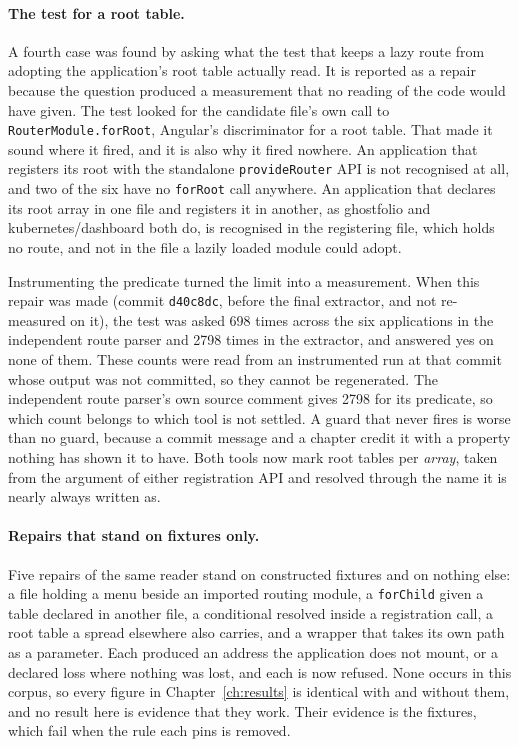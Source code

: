 \paragraph{The test for a root table.} A fourth case was found by asking what the test that keeps a lazy route from adopting the application's root table actually read. It is reported as a repair because the question produced a measurement that no reading of the code would have given. The test looked for the candidate file's own call to \texttt{RouterModule.forRoot}, Angular's discriminator for a root table. That made it sound where it fired, and it is also why it fired nowhere. An application that registers its root with the standalone \texttt{provideRouter} API is not recognised at all, and two of the six have no \texttt{forRoot} call anywhere. An application that declares its root array in one file and registers it in another, as ghostfolio and kubernetes/dashboard both do, is recognised in the registering file, which holds no route, and not in the file a lazily loaded module could adopt.

Instrumenting the predicate turned the limit into a measurement. When this repair was made (commit \texttt{d40c8dc}, before the final extractor, and not re-measured on it), the test was asked 698 times across the six applications in the independent route parser and 2798 times in the extractor, and answered yes on none of them. These counts were read from an instrumented run at that commit whose output was not committed, so they cannot be regenerated. The independent route parser's own source comment gives 2798 for its predicate, so which count belongs to which tool is not settled. A guard that never fires is worse than no guard, because a commit message and a chapter credit it with a property nothing has shown it to have. Both tools now mark root tables per \emph{array}, taken from the argument of either registration API and resolved through the name it is nearly always written as.

\paragraph{Repairs that stand on fixtures only.} Five repairs of the same reader stand on constructed fixtures and on nothing else: a file holding a menu beside an imported routing module, a \texttt{forChild} given a table declared in another file, a conditional resolved inside a registration call, a root table a spread elsewhere also carries, and a wrapper that takes its own path as a parameter. Each produced an address the application does not mount, or a declared loss where nothing was lost, and each is now refused. None occurs in this corpus, so every figure in Chapter~\ref{ch:results} is identical with and without them, and no result here is evidence that they work. Their evidence is the fixtures, which fail when the rule each pins is removed.

